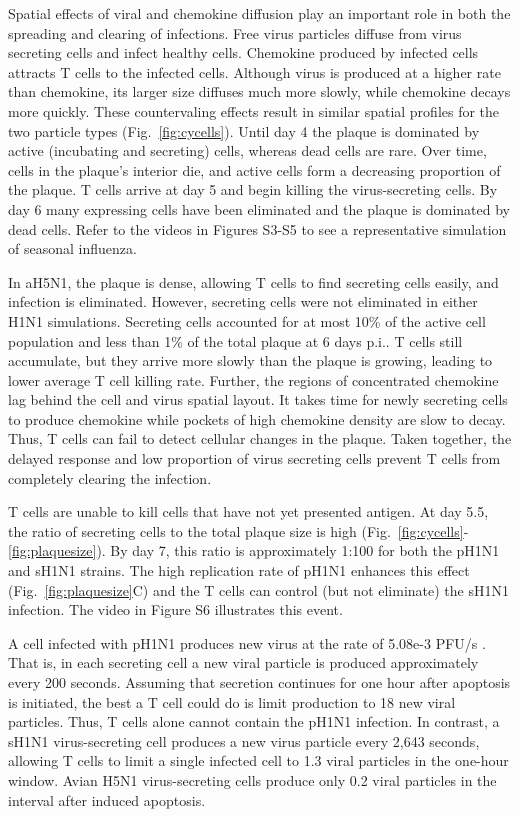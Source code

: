 \documentclass[10pt]{article}
\begin{document}
Spatial effects of viral and chemokine diffusion play an important role in both the spreading and clearing of infections.  Free virus particles diffuse from virus secreting cells and infect healthy cells.  Chemokine produced by infected cells attracts T cells to the infected cells.  Although virus is produced at a higher rate than chemokine, its larger size diffuses much more slowly, while chemokine decays more quickly.  These countervaling effects result in similar spatial profiles for the two particle types (Fig.~\ref{fig:cycells}). Until day 4 the plaque is dominated by active (incubating and secreting) cells, whereas dead cells are rare. Over time, cells in the plaque's interior die, and active cells form a decreasing proportion of the plaque. T cells arrive at day 5 and begin killing the virus-secreting cells. By day 6 many expressing cells have been eliminated and the plaque is dominated by dead cells.  Refer to the videos in Figures S3-S5 to see a representative simulation of seasonal influenza.

In aH5N1, the plaque is dense, allowing T cells to find secreting cells easily, and infection is eliminated.  However, secreting cells were not eliminated in either H1N1 simulations.  Secreting cells accounted for at most 10\% of the active cell population and less than 1\% of the total plaque at 6 days p.i..  T cells still accumulate, but they arrive more slowly than the plaque is growing, leading to lower average T cell killing rate.  Further, the regions of concentrated chemokine lag behind the cell and virus spatial layout.  It takes time for newly secreting cells to produce chemokine while pockets of high chemokine density are slow to decay.  Thus, T cells can fail to detect cellular changes in the plaque.  Taken together, the delayed response and low proportion of virus secreting cells prevent T cells from completely clearing the infection.

T cells are unable to kill cells that have not yet presented antigen.  At day 5.5, the ratio of secreting cells to the total plaque size is high (Fig.~\ref{fig:cycells}-\ref{fig:plaquesize}). By day 7, this ratio is approximately 1:100 for both the pH1N1 and sH1N1 strains.  The high replication rate of pH1N1 enhances this effect (Fig.~\ref{fig:plaquesize}C) and the T cells can control (but not eliminate) the sH1N1 infection.  The video in Figure S6 illustrates this event.

A cell infected with pH1N1 produces new virus at the rate of 5.08e-3 PFU/s \cite{Mitchell2011}.  That is, in each secreting cell a new viral particle is produced approximately every 200 seconds.  Assuming that secretion continues for one hour after apoptosis is initiated, the best a T cell could do is limit production to 18 new viral particles.  Thus, T cells alone cannot contain the pH1N1 infection.  In contrast, a sH1N1 virus-secreting cell produces a new virus particle every 2,643 seconds, allowing T cells to limit a single infected cell to 1.3 viral particles in the one-hour window.  Avian H5N1 virus-secreting cells produce only 0.2 viral particles in the interval after induced apoptosis. 
\end{document}
